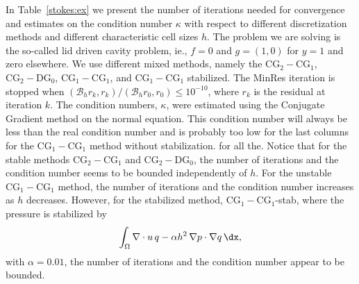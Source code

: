 In Table~\ref{stokes:ex} 
we present the number of iterations needed for convergence 
and estimates on the condition number $\kappa$ with 
respect to different discretization methods and different characteristic cell sizes $h$. The problem we
are solving is the so-called lid driven cavity problem, ie., $f=0$ and $g = (1,0)$ for $y=1$ and zero elsewhere.   
We use different mixed methods, namely  the  $\mathrm{CG}_2-\mathrm{CG}_1$, $\mathrm{CG}_2-\mathrm{DG}_0$,  
$\mathrm{CG}_1-\mathrm{CG}_1$, and  $\mathrm{CG}_1-\mathrm{CG}_1$ stabilized.  
The MinRes iteration is stopped when 
$(\mathcal{B}_h r_k, r_k)/(\mathcal{B}_h r_0, r_0) \le 10^{-10}$, where $r_k$ is the residual at
iteration $k$. 
The condition numbers, $\kappa$, were estimated using the Conjugate Gradient method on the
normal equation. This condition number will always be less 
than the real condition number and is probably too low
for the last columns for the $\mathrm{CG}_1-\mathrm{CG}_1$ method without stabilization. 
for all the. 
Notice that for the stable methods $\mathrm{CG}_2-\mathrm{CG}_1$ and $\mathrm{CG}_2-\mathrm{DG}_0$,
the number of iterations and the condition number seems to be bounded
independently of $h$. For the unstable $\mathrm{CG}_1-\mathrm{CG}_1$ method, the number of iterations
and the condition number increases as $h$ decreases. However, for 
the stabilized method, $\mathrm{CG}_1-\mathrm{CG}_1$-stab, where the pressure is stabilized by 
\[
\int_\Omega \nabla \cdot u \, q  - \alpha h^2 \, \nabla p \cdot \nabla q \,
    \dx,       
\]
with $\alpha=0.01$, the number of iterations and the condition number appear to be bounded. 

